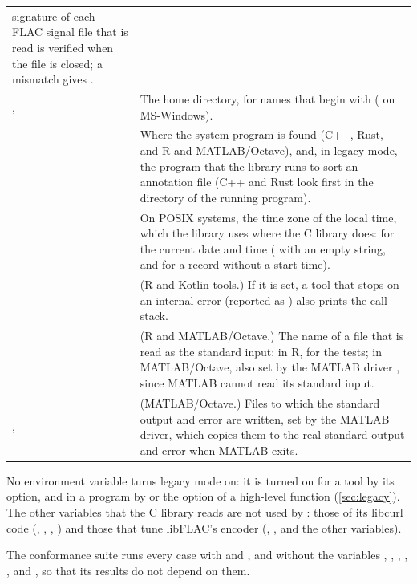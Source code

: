 \begin{xltabular}{\linewidth}{@{}P{3.9cm}L@{}}
  signature of each FLAC signal file that is read is verified when the file
  is closed; a mismatch gives . \\
,  & The home directory, for names that begin
  with \code{\textasciitilde} ( on MS-Windows). \\
 & Where the system  program is found (C++, Rust, and
  R and MATLAB/Octave), and, in legacy mode, the  program that
  the library runs to sort an annotation file (C++ and Rust look first in
  the directory of the running program). \\
 & On POSIX systems, the time zone of the local time, which the
  library uses where the C library does: for the current date and time
  ( with an empty string, and  for a record
  without a start time). \\
 & (R and Kotlin tools.) If it is set, a tool that stops
  on an internal error (reported as ) also prints
  the call stack. \\
 & (R and MATLAB/Octave.) The name of a file that is
  read as the standard input: in R, for the tests; in MATLAB/Octave, also
  set by the MATLAB driver , since MATLAB
  cannot read its standard input. \\
,  & (MATLAB/Octave.) Files to which
  the standard output and error are written, set by the MATLAB driver,
  which copies them to the real standard output and error when MATLAB
  exits. \\
\end{xltabular}

No environment variable turns legacy mode on: it is turned on for a tool by
its  option, and in a program by 
or the  option of a high-level function (\cref{sec:legacy}).
The other variables that the C library reads are not used by \wfdbx{}: those
of its libcurl code (, ,
, ) and those that tune
libFLAC's encoder (,
, and the other 
variables).

The conformance suite runs every case with  and ,
and without the variables , , ,
, ,  and
, so that its results do not depend on them.
